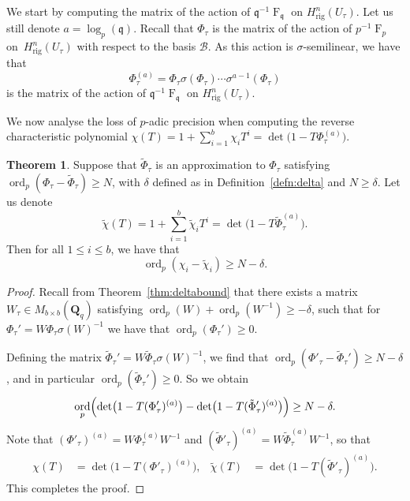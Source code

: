 \documentclass[a4paper,11pt]{article}
\numberwithin{equation}{section}
\newcommand{\QQ}{\mathbf{Q}} %
\DeclareMathOperator{\ord}{ord}          %
\DeclareMathOperator{\Frob}{F}           %
\providecommand{\Hrig}{H_{\text{rig}}}  %
\providecommand{\cB}{\mathcal{B}} %
\theoremstyle{definition}
\newtheorem{thm}{Theorem}[section]
\begin{document}
We start by computing the matrix of the action 
of $\mathfrak{q}^{-1} \Frob_{\mathfrak{q}}$ on $\Hrig^n(U_{\tau})$. 
Let us still denote $a=\log_p(\mathfrak{q})$. Recall that $\Phi_{\tau}$ 
is the matrix of the action of $p^{-1} \Frob_p$ on~$\Hrig^{n}(U_{\tau})$ 
with respect to the basis $\cB$. As this action is $\sigma$-semilinear, 
we have that 
\begin{equation*}
\Phi_{\tau}^{(a)} = 
    \Phi_{\tau} \sigma(\Phi_{\tau}) \dotsm \sigma^{a-1}(\Phi_{\tau})
\end{equation*}
is the matrix of the action of $\mathfrak{q}^{-1} \Frob_{\mathfrak{q}}$ 
on $\Hrig^n(U_{\tau})$. 

We now analyse the loss of $p$-adic precision when computing 
the reverse characteristic polynomial 
$\chi(T)=1+\sum_{i=1}^b \chi_i T^i=\det\bigl( 1 - T \Phi_{\tau}^{(a)}\bigr)$.

\begin{thm} \label{thm:preccharpoly}
Suppose that $\tilde{\Phi}_{\tau}$ is an approximation to 
$\Phi_{\tau}$ satisfying
$\ord_p (\Phi_{\tau}-\tilde{\Phi}_{\tau}) \geq N$,
with $\delta$ defined as in Definition~\ref{defn:delta} and $N \geq \delta$. 
Let us denote
\[
\tilde{\chi}(T) = 1 + \sum_{i=1}^b \tilde{\chi}_i T^i 
                = \det\bigl( 1 - T \tilde{\Phi}_{\tau}^{(a)}\bigr).
\]
Then for all $1 \leq i \leq b$, we have that 
\[
\ord_p (\chi_i - \tilde{\chi}_i) \geq N-\delta.
\]
\end{thm}

\begin{proof} 
Recall from Theorem~\ref{thm:deltabound} that there exists a matrix 
$W_{\tau} \in M_{b \times b}(\QQ_q)$ satisfying 
$\ord_p(W)+\ord_p(W^{-1}) \geq -\delta$, such that for 
$\Phi_{\tau}'=W \Phi_{\tau} \sigma(W)^{-1}$ 
we have that \mbox{$\ord_p(\Phi_{\tau}') \geq 0$}.

Defining the matrix 
$\tilde{\Phi}_{\tau}'=W \tilde{\Phi}_{\tau} \sigma(W)^{-1}$, we find that 
$\ord_p(\Phi'_{\tau}-\tilde{\Phi}_{\tau}') \geq N-\delta$, and in particular
$\ord_p(\tilde{\Phi}_{\tau}') \geq 0$. So we obtain
\[
\ord_p \Bigl( \det\bigl(1 - T (\Phi'_{\tau})^{(a)}\bigr) 
            - \det\bigl(1 - T (\tilde{\Phi}'_{\tau})^{(a)}\bigr) \Bigr) \geq N-\delta.
\] 
Note that $(\Phi'_{\tau})^{(a)}= W \Phi_{\tau}^{(a)} W^{-1}$
and $(\tilde{\Phi}'_{\tau})^{(a)}= W \tilde{\Phi}_{\tau}^{(a)} W^{-1}$, so that
\begin{align*}
\chi(T) &= \det\bigl(1 - T (\Phi'_{\tau})^{(a)}\bigr),
&\tilde{\chi}(T) &= \det\bigl(1 - T (\tilde{\Phi}'_{\tau})^{(a)}\bigr).
\end{align*}
This completes the proof.
\end{proof}
\end{document}
